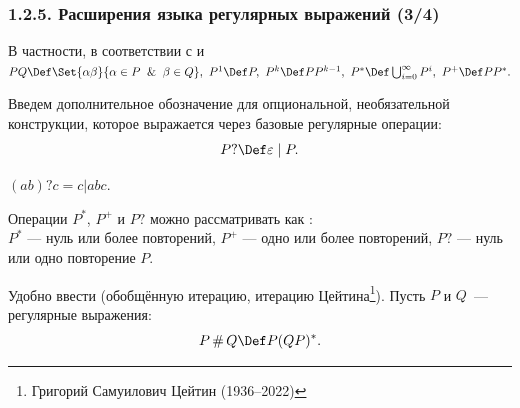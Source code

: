 \begin{frame}
\frametitle{1.2.5. Расширения языка регулярных выражений (3/4)}
В частности, в соответствии с  и \\
$ 
PQ \Def\Set{\alpha\beta}{\alpha\in P \And \beta\in Q}, \
P^1\Def P, \ 
P^k\Def PP^{k-1},\  
P^*\Def\bigcup_{i=0}^{\infty}P^i,\ P^+\Def PP^* .$

Введем дополнительное обозначение для опциональной, необязательной конструкции, которое  выражается через базовые регулярные операции:
$$
P? \Def \varepsilon \mid P.
$$

\begin{example}
$(ab)?c = c|abc.
$
\end{example}

\begin{remark}
Операции $P^*$, $P^+$ и $P?$ можно рассматривать как
:\\
$P^*$ --- нуль или более повторений,
$P^+$ --- одно или более повторений,
$P?$ --- нуль или одно повторение $P$.
\end{remark}

Удобно ввести 
(обобщённую итерацию, итерацию Цейтина\footnote{Григорий Самуилович Цейтин (1936--2022)}).
Пусть $P$ и $Q$~--- регулярные выражения:
$$
P \operatorname{\#} Q \Def P(QP)^*.
$$

\end{frame}


